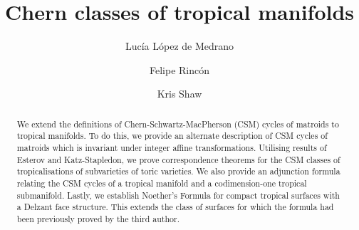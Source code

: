 \documentclass[a4paper,american,11pt]{amsart}
\numberwithin{equation}{section}
\begin{document}
\title{Chern classes of tropical manifolds}





\author{ Luc\'ia L\'opez de Medrano}
\address{Unidad Cuernavaca del Instituto de Matem\'aticas, Universidad Nacional Aut\'onoma de M\'exico. Cuernavaca, M\'exico.}


\author{Felipe Rinc\'on}
\address{School of Mathematical Sciences, Queen Mary University of London, London, United Kingdom.}

\author{Kris Shaw} 
\address{Department of Mathematics, University of Oslo, Oslo, Norway.}


\begin{abstract}
We extend the definitions of Chern-Schwartz-MacPherson (CSM) cycles of matroids to tropical manifolds. To do this, we provide an alternate description of CSM cycles of matroids which is invariant under integer affine transformations.
Utilising results of Esterov and Katz-Stapledon, we prove correspondence theorems for the CSM classes of tropicalisations of subvarieties of toric varieties. 
We also provide an adjunction formula relating the CSM cycles of a tropical manifold and a codimension-one tropical submanifold. 
Lastly, we establish Noether's Formula for compact tropical surfaces with a Delzant face structure. This extends the class of surfaces for which the formula had been previously proved by the third author. 
\end{abstract}

\maketitle
\tableofcontents



 





\end{document}

